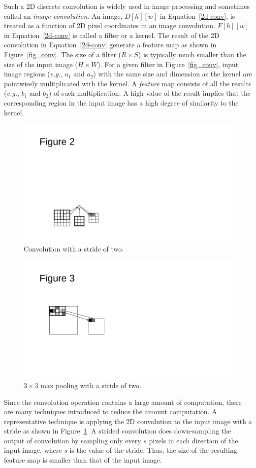Such a 2D discrete convolution is widely used in image processing and sometimes called an \textit{image convolution}. An image, $D[h][w]$ in Equation~\ref{2d-conv}, is treated as a function of 2D pixel coordinates in an image convolution. $F[h][w]$ in Equation~\ref{2d-conv} is called a filter or a kernel. The result of the 2D convolution in Equation~\ref{2d-conv} generate a feature map as shown in Figure~\ref{fig_conv}. The size of a filter ($R \times S$) is typically much smaller than the size of the input image ($H \times W$). For a given filter in Figure~\ref{fig_conv}, input image regions (\textit{e.g.}, $a_1$ and $a_2$) with the same size and dimension as the kernel are pointwisely multiplicated with the kernel. A \textit{feature} map consists of all the results (\textit{e.g.}, $b_1$ and $b_2$) of such multiplication. A high value of the result implies that the corresponding region in the input image has a high degree of similarity to the kernel. 

\begin{figure}[htbp]
  \centering
  \includegraphics[width=0.5\linewidth]{./figures/stride}
  \caption{Convolution with a stride of two. }
  \label{fig_stride}
\end{figure}

\begin{figure}[htbp]
  \centering
  \includegraphics[width=0.5\linewidth]{./figures/pooling}
  \caption{$3 \times 3$ max pooling with a stride of two. }
  \label{fig_pooling}
\end{figure}

Since the convolution operation contains a large amount of computation, there are many techniques introduced to reduce the amount computation. A representative technique is applying the 2D convolution to the input image with a stride as shown in Figure~\ref{fig_stride}. A strided convolution does down-sampling the output of convolution by sampling only every $s$ pixels in each direction of the input image, where $s$ is the value of the stride. Thus, the size of the resulting feature map is smaller than that of the input image. 

